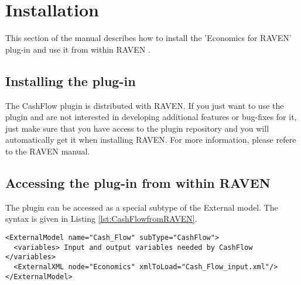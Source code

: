 
\section{Installation}
\label{sec:Installation}

This section of the manual describes how to install the 'Economics for RAVEN'  plug-in and use it from within RAVEN \cite{RAVEN}.

\subsection{Installing the plug-in}
The CashFlow plugin is distributed with RAVEN. If you just want to use the plugin and are not interested in developing additional features or bug-fixes for it, just make sure that you have access to the plugin repository and you will automatically get it when installing RAVEN.
For more information, please refere to the RAVEN manual.

\subsection{Accessing the plug-in from within RAVEN}
The plugin can be accessed as a special subtype of the External model. The syntax is given in Listing \ref{lst:CashFlowfromRAVEN}.

\begin{lstlisting}[style=XML,morekeywords={anAttribute},caption=Call CashFlow from RAVEN input., label=lst:CashFlowfromRAVEN]
<ExternalModel name="Cash_Flow" subType="CashFlow">
  <variables> Input and output variables needed by CashFlow  </variables>
  <ExternalXML node="Economics" xmlToLoad="Cash_Flow_input.xml"/>
</ExternalModel>
\end{lstlisting}
